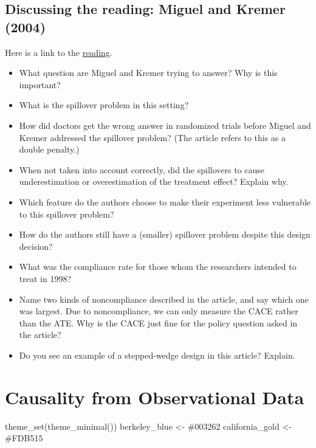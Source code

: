 \documentclass[
]{article}
\newenvironment{Shaded}{\begin{snugshade}}{\end{snugshade}}
\newcommand{\FunctionTok}[1]{\textcolor[rgb]{0.00,0.00,0.00}{#1}}
\newcommand{\NormalTok}[1]{#1}
\newcommand{\OtherTok}[1]{\textcolor[rgb]{0.56,0.35,0.01}{#1}}
\newcommand{\StringTok}[1]{\textcolor[rgb]{0.31,0.60,0.02}{#1}}
\providecommand{\tightlist}{%
  \setlength{\itemsep}{0pt}\setlength{\parskip}{0pt}}
\begin{document}
\hypertarget{discussing-the-reading-miguel-and-kremer-2004}{%
\subsection{Discussing the reading: Miguel and Kremer (2004)}\label{discussing-the-reading-miguel-and-kremer-2004}}

Here is a link to the \href{https://github.com/UC-Berkeley-I-School/mids-w241/blob/main/readings/Miguel.2004.pdf}{reading}.

\begin{itemize}
\tightlist
\item
  What question are Miguel and Kremer trying to answer? Why is this important?\\
\item
  What is the spillover problem in this setting?
\item
  How did doctors get the wrong answer in randomized trials before Miguel and Kremer addressed the spillover problem? (The article refers to this as a double penalty.)
\item
  When not taken into account correctly, did the spillovers to cause underestimation or overestimation of the treatment effect? Explain why.
\item
  Which feature do the authors choose to make their experiment less vulnerable to this spillover problem?
\item
  How do the authors still have a (smaller) spillover problem despite this design decision?
\item
  What was the compliance rate for those whom the researchers intended to treat in 1998?
\item
  Name two kinds of noncompliance described in the article, and say which one was largest.
  Due to noncompliance, we can only measure the CACE rather than the ATE. Why is the CACE just fine for the policy question asked in the article?
\item
  Do you see an example of a stepped-wedge design in this article? Explain.
\end{itemize}

\hypertarget{causality-from-observational-data}{%
\section{Causality from Observational Data}\label{causality-from-observational-data}}

\begin{Shaded}
\begin{Highlighting}[]
\FunctionTok{theme\_set}\NormalTok{(}\FunctionTok{theme\_minimal}\NormalTok{())}
\NormalTok{berkeley\_blue   }\OtherTok{\textless{}{-}} \StringTok{\textquotesingle{}\#003262\textquotesingle{}}
\NormalTok{california\_gold }\OtherTok{\textless{}{-}} \StringTok{\textquotesingle{}\#FDB515\textquotesingle{}}
\end{Highlighting}
\end{Shaded}
\end{document}

